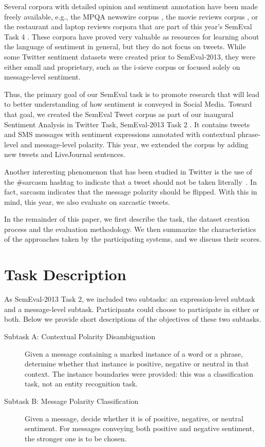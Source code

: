 \documentclass[11pt]{article}
\begin{document}
Several corpora with detailed opinion and sentiment annotation have been made freely available,
e.g., the MPQA newswire corpus \cite{Wiebe05},
the movie reviews corpus \cite{Pang:2002:TUS},
or the restaurant and laptop reviews corpora that are part of this year's SemEval Task 4 \cite{Semeval2014task4}.
These corpora have proved very valuable as resources for learning about the language of sentiment in general, but they do not focus on tweets. While some Twitter sentiment datasets were created prior to SemEval-2013, they were either small and proprietary, such as the i-sieve corpus \cite{Kouloumpis11} or focused solely on message-level sentiment.

Thus, the primary goal of our SemEval task is to promote research
that will lead to better understanding of how sentiment is conveyed in Social Media.
Toward that goal, we created the SemEval Tweet corpus as part of our inaugural Sentiment Analysis in Twitter Task, SemEval-2013 Task 2 \cite{semeval2013}. It contains tweets and SMS messages with sentiment expressions annotated with contextual phrase-level and message-level polarity. This year, we extended the corpus by adding new tweets and LiveJournal sentences.

Another interesting phenomenon that has been studied in Twitter is the use of the \#sarcasm hashtag to indicate that a tweet should not be taken literally~\cite{conf/acl/Gonzalez-IbanezMW11,liebrecht-kunneman-vandenbosch:2013:WASSA}.
In fact, sarcasm indicates that the message polarity should be flipped.
With this in mind, this year, we also evaluate on sarcastic tweets.

In the remainder of this paper, we first describe the task, the dataset creation process and the evaluation methodology.
We then summarize the characteristics of the approaches taken by the participating systems, and we discuss their scores.


\section{Task Description}

As SemEval-2013 Task 2, we included two subtasks: an expression-level subtask and a message-level subtask.
Participants could choose to participate in either or both.
Below we provide short descriptions of the objectives of these two subtasks.

\begin{description}
  \item[Subtask A: Contextual Polarity Disambiguation] Given a message containing a marked instance of a word or a phrase, determine whether that instance is positive, negative or neutral in that context.
      The instance boundaries were provided:
      this was a classification task, not an entity recognition task.
  \item [Subtask B: Message Polarity Classification]
  Given a message, decide whether it is of positive, negative, or neutral sentiment.
    For messages conveying both positive and negative sentiment, the stronger one is to be chosen.
\end{description}
\end{document}
